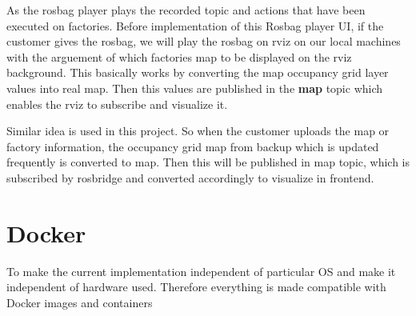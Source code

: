 As the rosbag player plays the recorded topic and actions that have been executed on factories. Before implementation of this Rosbag player UI, if the customer gives the rosbag, we will play the rosbag on rviz on our local machines with the arguement of which factories map to be displayed on the rviz background. This basically works by converting the map occupancy grid layer values into real map. Then this values are published in the \textbf{map} topic which enables the rviz to subscribe and visualize it. 

Similar idea is used in this project. So when the customer uploads the map or factory information, the occupancy grid map from backup which is updated frequently is converted to map. Then this will be published in map topic, which is subscribed by rosbridge and converted accordingly to visualize in frontend.
\section{Docker}

To make the current implementation independent of particular OS and make it independent of hardware used. Therefore everything is made compatible with Docker images and containers





